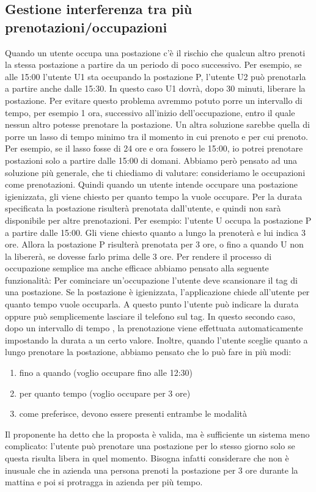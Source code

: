 \subsection*{Gestione interferenza tra più prenotazioni/occupazioni}
Quando un utente occupa una postazione c'è il rischio che qualcun altro prenoti la stessa postazione a partire da un periodo di poco successivo. Per esempio, se alle 15:00 l'utente U1 sta occupando la postazione P, l'utente U2 può prenotarla a partire anche dalle 15:30. In questo caso U1 dovrà, dopo 30 minuti, liberare la postazione.
Per evitare questo problema avremmo potuto porre un intervallo di tempo, per esempio 1 ora, successivo all'inizio dell'occupazione, entro il quale nessun altro potesse prenotare la postazione.
Un altra soluzione sarebbe quella di porre un lasso di tempo minimo tra il momento in cui prenoto e per cui prenoto. Per esempio, se il lasso fosse di 24 ore e ora fossero le 15:00, io potrei prenotare postazioni solo a partire dalle 15:00 di domani.
Abbiamo però pensato ad una soluzione più generale, che ti chiediamo di valutare: consideriamo le occupazioni come prenotazioni.
Quindi quando un utente intende occupare una postazione igienizzata, gli viene chiesto per quanto tempo la vuole occupare. Per la durata specificata la postazione risulterà prenotata dall'utente, e quindi non sarà disponibile per altre prenotazioni. Per esempio: l'utente U occupa la postazione P a partire dalle 15:00. Gli viene chiesto quanto a lungo la prenoterà e lui indica 3 ore. Allora la postazione P risulterà prenotata per 3 ore, o fino a quando U non la libererà, se dovesse farlo prima delle 3 ore.
Per rendere il processo di occupazione semplice ma anche efficace abbiamo pensato alla seguente funzionalità: \newline
Per cominciare un'occupazione l'utente deve scansionare il tag di una postazione. Se la postazione è igienizzata, l'applicazione chiede all'utente per quanto tempo vuole occuparla. A questo punto l'utente può indicare la durata oppure può semplicemente lasciare il telefono sul tag.
In questo secondo caso, dopo un intervallo di tempo , la prenotazione viene effettuata automaticamente impostando la durata a un certo valore.
Inoltre, quando l'utente sceglie quanto a lungo prenotare la postazione, abbiamo pensato che lo può fare in più modi:
\begin{enumerate}
\item fino a quando (voglio occupare fino alle 12:30)
\item per quanto tempo (voglio occupare per 3 ore)
\item come preferisce, devono essere presenti entrambe le modalità
\end{enumerate}
\indent Il proponente ha detto che la proposta è valida, ma è sufficiente un sistema meno complicato: l'utente può prenotare una postazione per lo stesso giorno solo se questa risulta libera in quel momento. Bisogna infatti considerare che non è inusuale che in azienda una persona prenoti la postazione per 3 ore durante la mattina e poi si protragga in azienda per più tempo.

